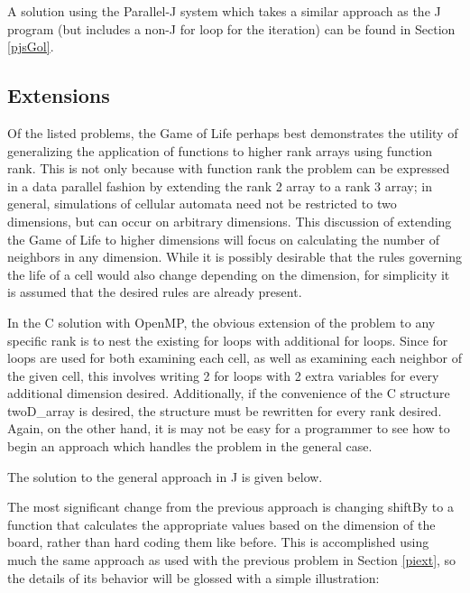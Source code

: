 A solution using the Parallel-J system which takes a similar approach as the J program 
(but includes a non-J for loop for the iteration)
can be found in Section \ref{pjsGol}.

\subsection{Extensions}
Of the listed problems, the Game of Life perhaps best demonstrates the utility 
of generalizing the application of functions to higher rank arrays using function rank.
This is not only because with function rank 
the problem can be expressed in a data parallel fashion by extending the rank 2 array to a rank 3 array;
in general, simulations of cellular automata need not be restricted to two dimensions, 
but can occur on arbitrary dimensions.
This discussion of extending the Game of Life to higher dimensions 
will focus on calculating the number of neighbors in any dimension.
While it is possibly desirable that the rules governing the life of a cell 
would also change depending on the dimension, 
for simplicity it is assumed that the desired rules are already present.

In the C solution with OpenMP, 
the obvious extension of the problem to any specific rank 
is to nest the existing for loops with additional for loops. 
Since for loops are used for both examining each cell, 
as well as examining each neighbor of the given cell, 
this involves writing 2 for loops with 2 extra variables for every additional dimension desired. 
Additionally, if the convenience of the C structure \ttfamily twoD\_array \normalfont is desired, 
the structure must be rewritten for every rank desired. 
Again, on the other hand, it is may not be easy for a programmer to see 
how to begin an approach which handles the problem in the general case.

The solution to the general approach in J is given below.

\begin{singlespacing}
\begin{small}

\end{small}
\end{singlespacing}

The most significant change from the previous approach 
is changing \ttfamily shiftBy \normalfont to a function 
that calculates the appropriate values based on the dimension of the board, 
rather than hard coding them like before.
This is accomplished using much the same approach 
as used with the previous problem in Section \ref{piext}, 
so the details of its behavior will be glossed with a simple illustration:


